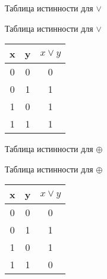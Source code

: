 \documentclass{beamer}
\begin{document}
\begin{frame}{Таблица истинности для $\lor$}
    \begin{block}{Таблица истинности для $\lor$}
        \begin{centering}
    \begin{tabular}{cc|c}
    x & y & $x \lor y$ \\ \hline
    0 & 0 & 0 \\
    0 & 1 & 1 \\
    1 & 0 & 1 \\
    1 & 1 & 1 \\
    \end{tabular}
\end{centering}
    \end{block}
    \end{frame}

    \begin{frame}{Таблица истинности для $\oplus$}
        \begin{block}{Таблица истинности для $\oplus$}
            \begin{centering}
        \begin{tabular}{cc|c}
        x & y & $x \lor y$ \\ \hline
        0 & 0 & 0 \\
        0 & 1 & 1 \\
        1 & 0 & 1 \\
        1 & 1 & 0 \\
        \end{tabular}
    \end{centering}
        \end{block}
        \end{frame}
    
\end{document}

